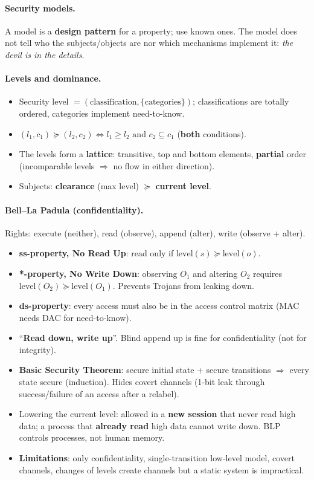 \paragraph{Security models.} A model is a \textbf{design pattern} for a property; use known ones. The model does not tell who the subjects/objects are nor which mechanisms implement it: \emph{the devil is in the details}.

\paragraph{Levels and dominance.}
\begin{itemize}
    \item Security level $= (\text{classification}, \{\text{categories}\})$; classifications are totally ordered, categories implement need-to-know.
    \item $(l_1, c_1) \succeq (l_2, c_2) \iff l_1 \geq l_2 \text{ and } c_2 \subseteq c_1$ (\textbf{both} conditions).
    \item The levels form a \textbf{lattice}: transitive, top and bottom elements, \textbf{partial} order (incomparable levels $\Rightarrow$ no flow in either direction).
    \item Subjects: \textbf{clearance} (max level) $\succeq$ \textbf{current level}.
\end{itemize}

\paragraph{Bell--La Padula (confidentiality).} Rights: execute (neither), read (observe), append (alter), write (observe + alter).
\begin{itemize}
    \item \textbf{ss-property, No Read Up}: read only if $\text{level}(s) \succeq \text{level}(o)$.
    \item \textbf{*-property, No Write Down}: observing $O_1$ and altering $O_2$ requires $\text{level}(O_2) \succeq \text{level}(O_1)$. Prevents Trojans from leaking down.
    \item \textbf{ds-property}: every access must also be in the access control matrix (MAC needs DAC for need-to-know).
    \item ``\textbf{Read down, write up}''. Blind append up is fine for confidentiality (not for integrity).
    \item \textbf{Basic Security Theorem}: secure initial state + secure transitions $\Rightarrow$ every state secure (induction). Hides covert channels (1-bit leak through success/failure of an access after a relabel).
    \item Lowering the current level: allowed in a \textbf{new session} that never read high data; a process that \textbf{already read} high data cannot write down. BLP controls processes, not human memory.
    \item \textbf{Limitations}: only confidentiality, single-transition low-level model, covert channels, changes of levels create channels but a static system is impractical.
\end{itemize}

